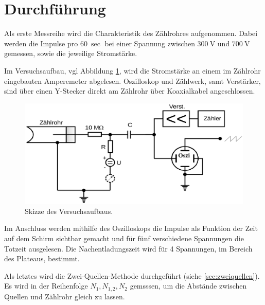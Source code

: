 \section{Durchführung}
\label{sec:Aufbau}
Als erste Messreihe wird die Charakteristik des Zählrohres aufgenommen.
Dabei werden die Impulse pro $\SI{60}{\sec}$ bei einer
Spannung zwischen $\SI{300}{\volt}$ und $\SI{700}{\volt}$ gemessen,
sowie die jeweilige Stromstärke.

Im Versuchsaufbau, vgl Abbildung \ref{fig:versuchsaufbau}, wird die Stromstärke
an einem im Zählrohr eingebauten Amperemeter abgelesen.
Oszilloskop und Zählwerk, samt Verstärker, sind über einen Y-Stecker direkt am
Zählrohr über Koaxialkabel angeschlossen.

\begin{figure}
    \centering
    \includegraphics[width=0.7\paperwidth]{content/aufbau.png}
    \caption{Skizze des Versuchsaufbaus. \cite{Anleitung}}
    \label{fig:versuchsaufbau}
\end{figure}

Im Anschluss werden mithilfe des Oszilloskops
die Impulse als Funktion der Zeit auf dem Schirm sichtbar gemacht und für fünf
verschiedene Spannungen die Totzeit ausgelesen.
Die Nachentladungszeit wird für 4 Spannungen, im Bereich des Plateaus, bestimmt.

Als letztes wird die Zwei-Quellen-Methode durchgeführt (siehe \ref{sec:zweiquellen}).
Es wird in der Reihenfolge $N_1, N_{1,2}, N_2$ gemsssen, um die Abstände zwischen
Quellen und Zählrohr gleich zu lassen.
